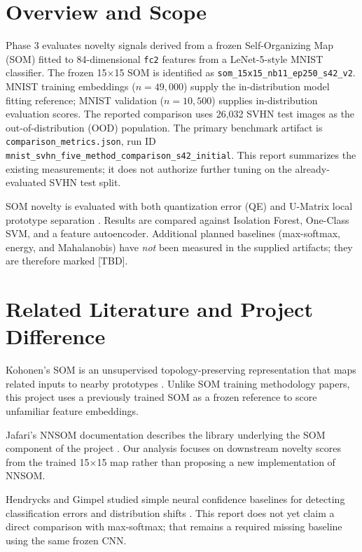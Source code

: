 \documentclass[11pt]{article}
\begin{document}
\section{Overview and Scope}
Phase 3 evaluates novelty signals derived from a frozen Self-Organizing Map (SOM) fitted to 84-dimensional \texttt{fc2} features from a LeNet-5-style MNIST classifier. The frozen 15$\times$15 SOM is identified as \texttt{som\_15x15\_nb11\_ep250\_s42\_v2}. MNIST training embeddings ($n=49{,}000$) supply the in-distribution model fitting reference; MNIST validation ($n=10{,}500$) supplies in-distribution evaluation scores. The reported comparison uses 26,032 SVHN test images as the out-of-distribution (OOD) population. The primary benchmark artifact is \texttt{comparison\_metrics.json}, run ID \texttt{mnist\_svhn\_five\_method\_comparison\_s42\_initial}. This report summarizes the existing measurements; it does not authorize further tuning on the already-evaluated SVHN test split.

SOM novelty is evaluated with both quantization error (QE) and U-Matrix local prototype separation \parencite{kohonen1990som,jafari_nnsom}. Results are compared against Isolation Forest, One-Class SVM, and a feature autoencoder. Additional planned baselines (max-softmax, energy, and Mahalanobis) have \emph{not} been measured in the supplied artifacts; they are therefore marked [TBD].

\section{Related Literature and Project Difference}
Kohonen's SOM is an unsupervised topology-preserving representation that maps related inputs to nearby prototypes \parencite{kohonen1990som}. Unlike SOM training methodology papers, this project uses a previously trained SOM as a frozen reference to score unfamiliar feature embeddings.

Jafari's NNSOM documentation describes the library underlying the SOM component of the project \parencite{jafari_nnsom}. Our analysis focuses on downstream novelty scores from the trained 15$\times$15 map rather than proposing a new implementation of NNSOM.

Hendrycks and Gimpel studied simple neural confidence baselines for detecting classification errors and distribution shifts \parencite{hendrycks2017baseline}. This report does not yet claim a direct comparison with max-softmax; that remains a required missing baseline using the same frozen CNN.
\end{document}
